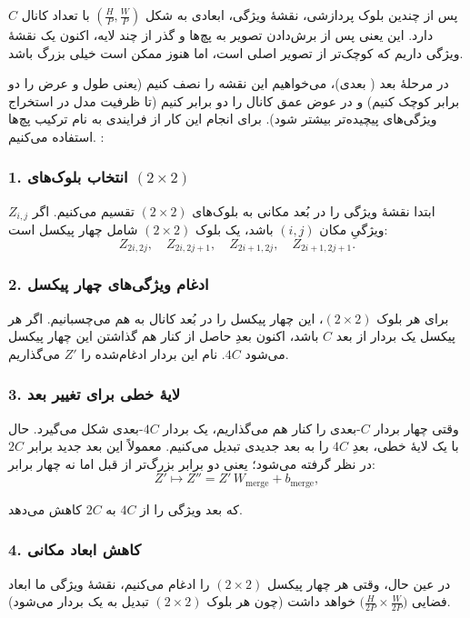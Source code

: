 پس از چندین بلوک پردازشی، نقشهٔ ویژگی، ابعادی به شکل \((\tfrac{H}{P}, \tfrac{W}{P})\) با تعداد کانال \(\displaystyle C\) دارد. 
این یعنی پس از برش‌دادن تصویر به پچ‌ها و گذر از چند لایه، اکنون یک نقشهٔ ویژگی داریم که کوچک‌تر از تصویر اصلی است، 
اما هنوز ممکن است خیلی بزرگ باشد.

در مرحلهٔ بعد ( بعدی)، می‌خواهیم این نقشه را نصف کنیم 
(یعنی طول و عرض را دو برابر کوچک کنیم) و در عوض عمق کانال را دو برابر کنیم 
(تا ظرفیت مدل در استخراج ویژگی‌های پیچیده‌تر بیشتر شود). برای انجام این کار از فرایندی به نام 
ترکیب پچ‌ها استفاده می‌کنیم.
\cite{liu2021swintransformer}:

\subsubsection{1. انتخاب بلوک‌های \((2 \times 2)\)}
ابتدا نقشهٔ ویژگی را در بُعد مکانی به بلوک‌های \((2 \times 2)\) تقسیم می‌کنیم.  
اگر \(\displaystyle Z_{i,j}\) ویژگیِ مکان \((i, j)\) باشد، 
یک بلوک \((2 \times 2)\) شامل چهار پیکسل است:
\[
Z_{2i, 2j}, \quad Z_{2i, 2j+1}, \quad Z_{2i+1, 2j}, \quad Z_{2i+1, 2j+1}.
\]

\subsubsection{2. ادغام ویژگی‌های چهار پیکسل}
برای هر بلوک \((2 \times 2)\)، این چهار پیکسل را در بُعد کانال به هم می‌چسبانیم.  
اگر هر پیکسل یک بردار از بعد \(\displaystyle C\) باشد، اکنون بعدِ حاصل از کنار هم گذاشتن این چهار پیکسل می‌شود \(\displaystyle 4C\).  
نام این بردار ادغام‌شده را \(\displaystyle Z'\) می‌گذاریم.

\subsubsection{3. لایهٔ خطی برای تغییر بعد}
وقتی چهار بردار \(\displaystyle C\)-بعدی را کنار هم می‌گذاریم، یک بردار \(\displaystyle 4C\)-بعدی شکل می‌گیرد.  
حال با یک لایهٔ خطی، بعدِ \(\displaystyle 4C\) را به بعد جدیدی تبدیل می‌کنیم.  
معمولاً این بعد جدید برابر \(\displaystyle 2C\) در نظر گرفته می‌شود؛ 
یعنی دو برابر بزرگ‌تر از قبل اما نه چهار برابر:
\begin{equation}
	Z' \mapsto Z'' = Z' \, W_{\text{merge}} + b_{\text{merge}},
	\label{eq:merge_transform}
\end{equation}

که بعد ویژگی را از \(\displaystyle 4C\) به \(\displaystyle 2C\) کاهش می‌دهد.

\subsubsection{4. کاهش ابعاد مکانی}
در عین حال، وقتی هر چهار پیکسل \((2 \times 2)\) را ادغام می‌کنیم، 
نقشهٔ ویژگی ما ابعاد فضایی \(\bigl(\tfrac{H}{2P} \times \tfrac{W}{2P}\bigr)\) خواهد داشت 
(چون هر بلوک \((2 \times 2)\) تبدیل به یک بردار می‌شود).

